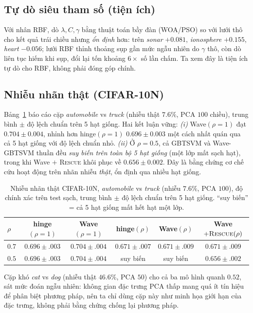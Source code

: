 \documentclass[11pt,a4paper]{article}
\newcommand{\R}{\textsc{Rescue}}
\begin{document}
\subsection{Tự dò siêu tham số (tiện ích)}
Với nhân RBF, dò $\lambda,C,\gamma$ bằng thuật toán bầy đàn (WOA/PSO) so với lưới thô cho kết quả trái chiều nhưng \emph{ổn định} hơn: trên \textit{sonar} $+0.081$, \textit{ionosphere} $+0.155$, \textit{heart} $-0.056$; lưới RBF thỉnh thoảng sụp gần mức ngẫu nhiên do $\gamma$ thô, còn dò liên tục hiếm khi sụp, đổi lại tốn khoảng $6\times$ số lần chấm. Ta xem đây là tiện ích tự dò cho RBF, không phải đóng góp chính.

\subsection{Nhiễu nhãn thật (CIFAR-10N)}
\label{sec:realnoise}
Bảng~\ref{tab:real} báo cáo cặp \textit{automobile} vs \textit{truck} (nhiễu thật $7.6\%$, PCA $100$ chiều), trung bình $\pm$ độ lệch chuẩn trên 5 hạt giống. Hai kết luận vững:
\emph{(i)} Wave$(\rho{=}1)$ đạt $0.704\pm 0.004$, nhỉnh hơn hinge$(\rho{=}1)$ $0.696\pm 0.003$ một cách nhất quán qua cả 5 hạt giống với độ lệch chuẩn nhỏ.
\emph{(ii)} Ở $\rho=0.5$, cả GBTSVM và Wave-GBTSVM thuần đều \emph{suy biến trên toàn bộ 5 hạt giống} (một lớp mất sạch hạt), trong khi Wave $+$ \R{} khôi phục về $0.656\pm 0.002$. Đây là bằng chứng cơ chế cứu hoạt động trên nhãn nhiễu \emph{thật}, ổn định qua nhiều hạt giống.

\begin{table}[h]
\centering
\caption{Nhiễu nhãn thật CIFAR-10N, \textit{automobile} vs \textit{truck} (nhiễu $7.6\%$, PCA $100$), độ chính xác trên test sạch, trung bình $\pm$ độ lệch chuẩn trên 5 hạt giống. ``suy biến'' = cả 5 hạt giống mất hết hạt một lớp.}
\label{tab:real}
\begin{tabular}{lccccc}
\toprule
$\rho$ & hinge$(\rho{=}1)$ & Wave$(\rho{=}1)$ & hinge$(\rho)$ & Wave$(\rho)$ & Wave$+\R{}(\rho)$ \\
\midrule
$0.7$ & $0.696{\pm}.003$ & $\mathbf{0.704{\pm}.004}$ & $0.671{\pm}.007$ & $0.671{\pm}.009$ & $0.671{\pm}.009$ \\
$0.5$ & $0.696{\pm}.003$ & $\mathbf{0.704{\pm}.004}$ & suy biến & suy biến & $\mathbf{0.656{\pm}.002}$ \\
\bottomrule
\end{tabular}
\end{table}

Cặp khó \textit{cat} vs \textit{dog} (nhiễu thật $46.6\%$, PCA $50$) cho cả ba mô hình quanh $0.52$, sát mức đoán ngẫu nhiên: không gian đặc trưng PCA thấp mang quá ít tín hiệu để phân biệt phương pháp, nên ta chỉ dùng cặp này như minh họa giới hạn của đặc trưng, không phải bằng chứng chống lại phương pháp.
\end{document}
